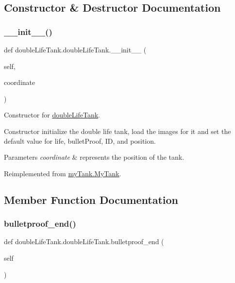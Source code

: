 \subsection{Constructor \& Destructor Documentation}
\mbox{\label{classdouble_life_tank_1_1double_life_tank_ad27cec1b61748291063b450bf31d4812}} 
\subsubsection{\texorpdfstring{\_\_init\_\_()}{\_\_init\_\_()}}
{\footnotesize\ttfamily def double\+Life\+Tank.\+double\+Life\+Tank.\+\_\+\+\_\+init\+\_\+\+\_\+ (\begin{DoxyParamCaption}\item[{}]{self,  }\item[{}]{coordinate }\end{DoxyParamCaption})}



Constructor for \mbox{\hyperlink{classdouble_life_tank_1_1double_life_tank}{double\+Life\+Tank}}. 

Constructor initialize the double life tank, load the images for it and set the default value for life, bullet\+Proof, ID, and position. 
\begin{DoxyParams}{Parameters}
{\em coordinate} & represents the position of the tank. \\
\hline
\end{DoxyParams}


Reimplemented from \mbox{\hyperlink{classmy_tank_1_1_my_tank_a5a2b6c586c454d3801f6701a6befb7e5}{my\+Tank.\+My\+Tank}}.



\subsection{Member Function Documentation}
\mbox{\label{classdouble_life_tank_1_1double_life_tank_a2db7f3a483f7c1c6b2e4b61266509389}} 
\subsubsection{\texorpdfstring{bulletproof\_end()}{bulletproof\_end()}}
{\footnotesize\ttfamily def double\+Life\+Tank.\+double\+Life\+Tank.\+bulletproof\+\_\+end (\begin{DoxyParamCaption}\item[{}]{self }\end{DoxyParamCaption})}




